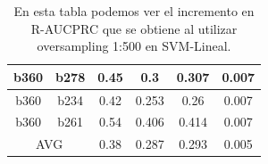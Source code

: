 \begin{table}[ht]
\begin{tabular}{|c|c|c|c|c|c|}
b360                & b278               & 0.45        & 0.3                       & 0.307                     & 0.007         \\ \hline
b360                & b234               & 0.42        & 0.253                     & 0.26                      & 0.007         \\ \hline
b360                & b261               & 0.54        & 0.406                     & 0.414                     & 0.007         \\ \hline
\multicolumn{2}{|c|}{AVG}                & 0.38        & 0.287                     & 0.293                     & 0.005         \\ \hline
\end{tabular}
\caption{En esta tabla podemos ver el incremento en R-AUCPRC que se obtiene al utilizar oversampling 1:500 en SVM-Lineal. }
\label{tab:imb_comparison_l} 
\end{table}
